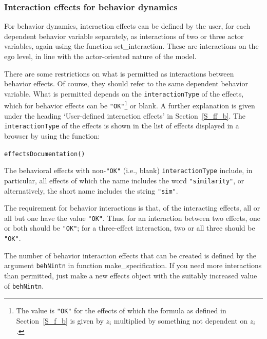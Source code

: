 \documentclass[a4paper,fleqn,11pt]{article}
\newcommand{\+}{\, + \,}
\newcommand{\sfn}[1]{\textsf{#1}}
\begin{document}
\subsubsection{Interaction effects for behavior dynamics}
\label{S_beh_infl}

For behavior dynamics, interaction effects can be defined
by the user, for each dependent behavior variable separately,
as interactions of two or three actor variables,
again using the function \textsf{set\_interaction}.
These are interactions on the ego level, in line with the
actor-oriented nature of the model.

There are some restrictions on what is permitted
as interactions between behavior effects.
Of course,  they should refer to the same dependent behavior variable.
What is permitted depends on the \texttt{interactionType} of the
effects, which for behavior effects can be \texttt{"OK"}\footnote{The value
is \texttt{"OK"} for the effects of which the
formula as defined in Section~\ref{S_f_b}
is given by $z_i$ multiplied by something not dependent on $z_i$.}
or blank.
A further explanation is given under the heading `User-defined interaction effects'
in Section~\ref{S_ff_b}.
The \texttt{interactionType} of the effects
is shown in the list of effects displayed in a browser by using the function:

\verb|effectsDocumentation()|
\bigskip

The behavioral effects with non-\texttt{"OK"} (i.e., blank)
\texttt{interactionType} include,
in particular, all effects of which the name
includes the word \texttt{"similarity"},
or alternatively, the short name includes the string \texttt{"sim"}.

The requirement for behavior interactions is that,
of the interacting effects, all or all but one have
the value \texttt{"OK"}. Thus, for an interaction between two effects,
one or both should be \texttt{"OK"}; for a three-effect interaction,
two or all three should be \texttt{"OK"}.

The number of behavior interaction effects that can be created is defined by the
argument \texttt{behNintn} in function \sfn{make\_specification}. If you need more
interactions than permitted, just make a new effects object with the
suitably increased value of \texttt{behNintn}.
\end{document}
